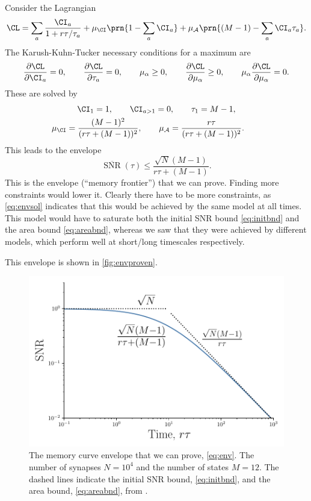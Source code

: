 \documentclass[12pt]{article}
\DeclareMathOperator{\snr}{SNR}
\newcommand{\snrb}{\overline{\snr}}
\newcommand{\CA}{\mathcal{A}}
\renewcommand{\pdiff}[2]{\frac{\partial #1}{\partial #2}}
\begin{document}
Consider the Lagrangian
%
\begin{equation}\label{eq:envlagrangian}
  \CL = \sum_a \frac{\CI_a}{1+r\tau/\tau_a} + \mu_\CI \prn{1 - \sum_a \CI_a} + \mu_\CA \prn{(M-1) - \sum_a \CI_a \tau_a}.
\end{equation}
%
The Karush-Kuhn-Tucker necessary conditions for a maximum are
%
\begin{equation}\label{eq:envKTcond}
  \pdiff{\CL}{\CI_a} = 0, \qquad
  \pdiff{\CL}{\tau_a} = 0, \qquad
  \mu_\alpha \geq 0, \qquad
  \pdiff{\CL}{\mu_\alpha} \geq 0, \qquad
  \mu_\alpha\pdiff{\CL}{\mu_\alpha} = 0.
\end{equation}
%
These are solved by
%
\begin{equation}\label{eq:envsol}
\begin{gathered}
  \CI_1 = 1, \qquad
  \CI_{a>1} = 0, \qquad
  \tau_1 = M-1, \\
  \mu_\CI = \frac{(M-1)^2}{(r\tau + (M-1))^2}, \qquad
  \mu_\CA = \frac{r\tau}{(r\tau+(M-1))^2}. \qquad
\end{gathered}
\end{equation}
%
This leads to the envelope
%
\begin{equation}\label{eq:env}
  \snrb(\tau) \leq \frac{\sqrt{N}(M-1)}{r\tau + (M-1)}.
\end{equation}
%
This is the envelope (``memory frontier'') that we can prove.
Finding more constraints would lower it.
Clearly there have to be more constraints, as \eqref{eq:envsol} indicates that this would be achieved by the same model at all times.
This model would have to saturate both the initial SNR bound \eqref{eq:initbnd} and the area bound \eqref{eq:areabnd}, whereas we saw that they were achieved by different models, which perform well at short/long timescales respectively.

This envelope is shown in \autoref{fig:envproven}.


\begin{figure}[tb]
  \centering
  \includegraphics[width=0.8\linewidth]{LenvProven.pdf}
  \caption[Proven envelope for the signal-to-noise ratio]
  {The memory curve envelope that we can prove, \eqref{eq:env}.
  The number of synapses $N=10^4$ and the number of states $M=12$.
  The dashed lines indicate the initial SNR bound, \eqref{eq:initbnd}, and the area bound, \eqref{eq:areabnd}, from \cite{Lahiri2013synapse}.}\label{fig:envproven}
\end{figure}
\end{document}
